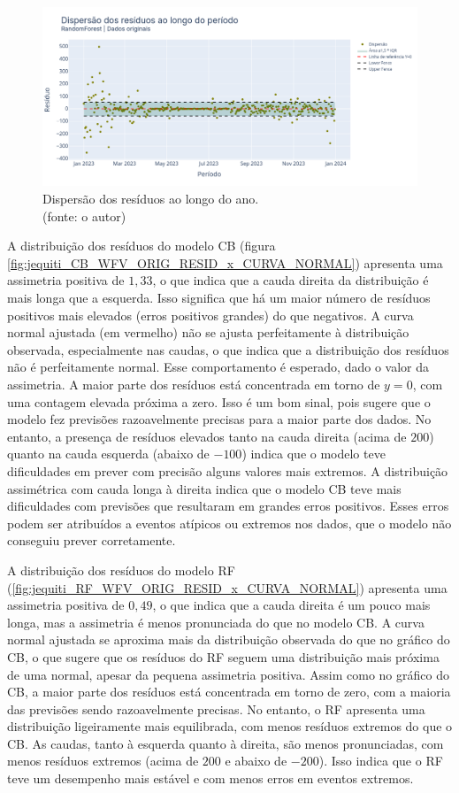 \begin{figure}[!h]
\centering
\includegraphics[scale=0.33]{Figuras/jequiti/resultados/RF_WFV_ORIG_RESID_x_TEMPO.png}
\caption{Dispersão dos resíduos ao longo do ano.\\(fonte: o autor)}
\label{fig:jequiti_RF_WFV_ORIG_RESID_x_TEMPO}
\end{figure}
\clearpage

A distribuição dos resíduos do modelo CB (figura \ref{fig:jequiti_CB_WFV_ORIG_RESID_x_CURVA_NORMAL}) apresenta uma assimetria positiva de $1,33$, o que indica que a cauda direita da distribuição é mais longa que a esquerda. Isso significa que há um maior número de resíduos positivos mais elevados (erros positivos grandes) do que negativos. A curva normal ajustada (em vermelho) não se ajusta perfeitamente à distribuição observada, especialmente nas caudas, o que indica que a distribuição dos resíduos não é perfeitamente normal. Esse comportamento é esperado, dado o valor da assimetria. A maior parte dos resíduos está concentrada em torno de $y=0$, com uma contagem elevada próxima a zero. Isso é um bom sinal, pois sugere que o modelo fez previsões razoavelmente precisas para a maior parte dos dados.
No entanto, a presença de resíduos elevados tanto na cauda direita (acima de $200$) quanto na cauda esquerda (abaixo de $-100$) indica que o modelo teve dificuldades em prever com precisão alguns valores mais extremos. A distribuição assimétrica com cauda longa à direita indica que o modelo CB teve mais dificuldades com previsões que resultaram em grandes erros positivos. Esses erros podem ser atribuídos a eventos atípicos ou extremos nos dados, que o modelo não conseguiu prever corretamente.

A distribuição dos resíduos do modelo RF (\ref{fig:jequiti_RF_WFV_ORIG_RESID_x_CURVA_NORMAL}) apresenta uma assimetria positiva de $0,49$, o que indica que a cauda direita é um pouco mais longa, mas a assimetria é menos pronunciada do que no modelo CB. A curva normal ajustada se aproxima mais da distribuição observada do que no gráfico do CB, o que sugere que os resíduos do RF seguem uma distribuição mais próxima de uma normal, apesar da pequena assimetria positiva. Assim como no gráfico do CB, a maior parte dos resíduos está concentrada em torno de zero, com a maioria das previsões sendo razoavelmente precisas. No entanto, o RF apresenta uma distribuição ligeiramente mais equilibrada, com menos resíduos extremos do que o CB. As caudas, tanto à esquerda quanto à direita, são menos pronunciadas, com menos resíduos extremos (acima de $200$ e abaixo de $-200$). Isso indica que o RF teve um desempenho mais estável e com menos erros em eventos extremos.

